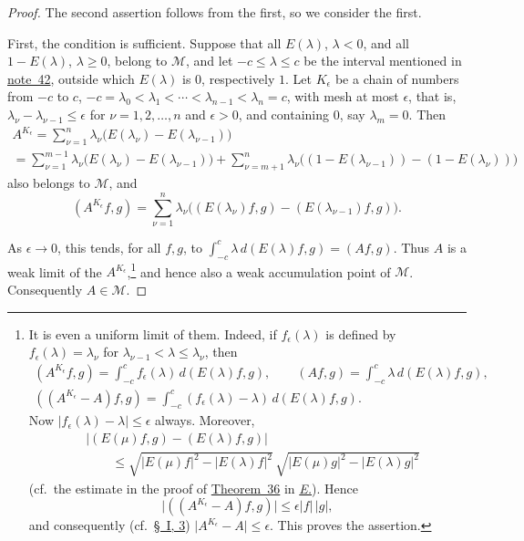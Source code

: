 \documentclass[
  paper=b5,
  twoside=true,
  fontsize=13pt,
  headings=normal,
  bookmarkpackage=false
]{scrartcl}
\theoremstyle{definition}
\newcommand{\NoteRef}[1]{\hyperref[fn:#1]{note~#1}}
\newcommand{\Eref}{\hyperref[fn:E-paper]{\emph{E.}}}
\newcommand{\ErefText}[1]{\href{https://doi.org/10.1007/BF01782338}{#1}}
\begin{document}
\begin{proof}
The second assertion follows from the first, so we consider the first.

First, the condition is sufficient.  Suppose that all
\(E(\lambda)\), \(\lambda<0\), and all
\(1-E(\lambda)\), \(\lambda\geq0\), belong to \(\mathcal M\), and let
\(-c\leq\lambda\leq c\) be the interval mentioned in \NoteRef{42},
outside which \(E(\lambda)\) is \(0\), respectively \(1\).  Let
\(K_\epsilon\) be a chain of numbers from \(-c\) to \(c\),
\(-c=\lambda_0<\lambda_1<\cdots<\lambda_{n-1}<\lambda_n=c\), with mesh at
most \(\epsilon\), that is, \(\lambda_\nu-\lambda_{\nu-1}\leq\epsilon\)
for \(\nu=1,2,\ldots,n\) and \(\epsilon>0\), and containing \(0\), say
\(\lambda_m=0\). Then
\begin{gather*}
  A^{K_\epsilon}=\sum_{\nu=1}^{n}
    \lambda_\nu\bigl(E(\lambda_\nu)-E(\lambda_{\nu-1})\bigr)\\
  =\sum_{\nu=1}^{m-1}
    \lambda_\nu\bigl(E(\lambda_\nu)-E(\lambda_{\nu-1})\bigr)
    +\sum_{\nu=m+1}^{n}
    \lambda_\nu\bigl((1-E(\lambda_{\nu-1}))-(1-E(\lambda_\nu))\bigr)
\end{gather*}
also belongs to \(\mathcal M\), and
\[
  (A^{K_\epsilon}f,g)
  =\sum_{\nu=1}^{n}\lambda_\nu
   \bigl((E(\lambda_\nu)f,g)
        -(E(\lambda_{\nu-1})f,g)\bigr).
\]

As \(\epsilon\to0\), this tends, for all \(f,g\), to
\(\int_{-c}^{c}\lambda\,d(E(\lambda)f,g)=(Af,g)\).
Thus \(A\) is a weak limit of the \(A^{K_\epsilon}\),\footnote{
\label{fn:43}It is even a uniform limit of them.  Indeed, if
\(f_\epsilon(\lambda)\) is defined by
\(f_\epsilon(\lambda)=\lambda_\nu\) for
\(\lambda_{\nu-1}<\lambda\leq\lambda_\nu\), then
\begin{gather*}
  (A^{K_\epsilon}f,g)=\int_{-c}^{c}f_\epsilon(\lambda)\,d(E(\lambda)f,g),
  \qquad (Af,g)=\int_{-c}^{c}\lambda\,d(E(\lambda)f,g),\\
  ((A^{K_\epsilon}-A)f,g)=\int_{-c}^{c}
    (f_\epsilon(\lambda)-\lambda)\,d(E(\lambda)f,g).
\end{gather*}
Now \(\lvert f_\epsilon(\lambda)-\lambda\rvert\leq\epsilon\) always.
Moreover,
\[
\begin{aligned}
&\lvert(E(\mu)f,g)-(E(\lambda)f,g)\rvert\\
&\qquad\leq
 \sqrt{\lvert E(\mu)f\rvert^2-\lvert E(\lambda)f\rvert^2}\,
 \sqrt{\lvert E(\mu)g\rvert^2-\lvert E(\lambda)g\rvert^2}
\end{aligned}
\]
(cf.\ the estimate in the proof of \ErefText{Theorem~36} in \Eref). Hence
\[
  \lvert((A^{K_\epsilon}-A)f,g)\rvert
  \leq\epsilon\lvert f\rvert\,\lvert g\rvert,
\]
and consequently (cf.\ \hyperref[sec:topologies-3]{\S~I, 3})
\(\lvert A^{K_\epsilon}-A\rvert\leq\epsilon\).  This proves the
assertion.}
and hence also a weak accumulation point of \(\mathcal M\).
Consequently \(A\in\mathcal M\).


\end{proof}
\end{document}
